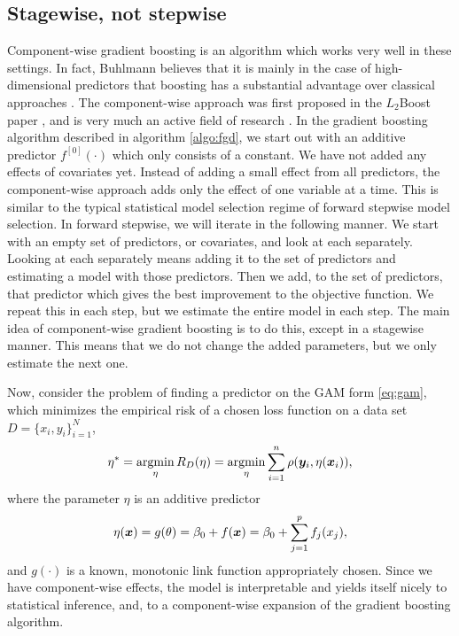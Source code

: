 \subsection{Stagewise, not stepwise}
Component-wise gradient boosting is an algorithm which works very well in these settings.
In fact, Buhlmann believes that it is mainly in the case of high-dimensional predictors that boosting has a substantial advantage over classical approaches \citep{buhlmann2006}.
The component-wise approach was first proposed in the $L_2$Boost paper \citep{buhlmann-yu}, and is very much an active field of research \citep{buhlmann2006, mayr14a, mayr14b, mayr17}.
In the gradient boosting algorithm described in algorithm \eqref{algo:fgd}, we start out with an additive predictor $f^{[0]}(\cdot)$ which only consists of a constant.
We have not added any effects of covariates yet.
Instead of adding a small effect from all predictors, the component-wise approach adds only the effect of one variable at a time.
This is similar to the typical statistical model selection regime of forward stepwise model selection.
In forward stepwise, we will iterate in the following manner.
We start with an empty set of predictors, or covariates, and look at each separately. Looking at each separately means adding it to the set of predictors and estimating a model with those predictors.
Then we add, to the set of predictors, that predictor which gives the best improvement to the objective function.
We repeat this in each step, but we estimate the entire model in each step.
The main idea of component-wise gradient boosting is to do this, except in a stagewise manner.
This means that we do not change the added parameters, but we only estimate the next one.

Now, consider the problem of finding a predictor on the GAM form \eqref{eq:gam}, which minimizes the empirical risk of a chosen loss function on a data set $D=\{x_i,y_i\}_{i=1}^N$,
\begin{equation}\label{eq:argmin-eta}
    \eta^*=\operatorname*{argmin}_{\eta}R_D(\eta)=\operatorname*{argmin}_{\eta}\sum_{i=1}^n\rho(\bm{y}_i,\eta(\bm{x}_i)),
\end{equation}
where the parameter $\eta$ is an additive predictor
\begin{equation*}
    \eta(\bm{x})=g(\theta)=\beta_0+f(\bm{x})=\beta_0+\sum_{j=1}^p f_j(x_j),
\end{equation*}
and $g(\cdot)$ is a known, monotonic link function appropriately chosen.
Since we have component-wise effects, the model is interpretable and yields itself nicely to statistical inference, and, to a component-wise expansion of the gradient boosting algorithm.


